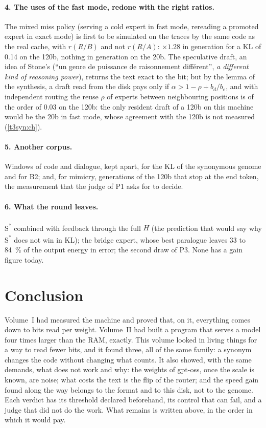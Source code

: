 \paragraph{4. The uses of the fast mode, redone with the right ratios.} The mixed miss policy (serving a cold expert in fast mode, rereading a promoted expert in exact mode) is first to be simulated on the traces by the same code as the real cache, with $r(R/B)$ and not $r(R/A)$: $\times 1.28$ in generation for a KL of \num{0.14} on the 120b, nothing in generation on the 20b. The speculative draft, an idea of Stone's (``un genre de puissance de raisonnement différent'', \emph{a different kind of reasoning power}), returns the text exact to the bit; but by the lemma of the synthesis, a draft read from the disk pays only if $\alpha > 1 - \rho + b_d/b_e$, and with independent routing the reuse $\rho$ of experts between neighbouring positions is of the order of \num{0.03} on the 120b: the only resident draft of a 120b on this machine would be the 20b in fast mode, whose agreement with the 120b is not measured (\cref{t3syn:ch}).

\paragraph{5. Another corpus.} Windows of code and dialogue, kept apart, for the KL of the synonymous genome and for B2; and, for mimicry, generations of the 120b that stop at the end token, the measurement that the judge of P1 asks for to decide.

\paragraph{6. What the round leaves.} S\textsuperscript{*} combined with feedback through the full $H$ (the prediction that would say why S\textsuperscript{*} does not win in KL); the bridge expert, whose best paralogue leaves 33 to \SI{84}{\percent} of the output energy in error; the second draw of P3. None has a gain figure today.

\section*{Conclusion}\label{t3dis:sec:conclusion}

Volume~I had measured the machine and proved that, on it, everything comes down to bits read per weight. Volume~II had built a program that serves a model four times larger than the RAM, exactly. This volume looked in living things for a way to read fewer bits, and it found three, all of the same family: a synonym changes the code without changing what counts. It also showed, with the same demands, what does not work and why: the weights of gpt-oss, once the scale is known, are noise; what costs the text is the flip of the router; and the speed gain found along the way belongs to the format and to this disk, not to the genome. Each verdict has its threshold declared beforehand, its control that can fail, and a judge that did not do the work. What remains is written above, in the order in which it would pay.
